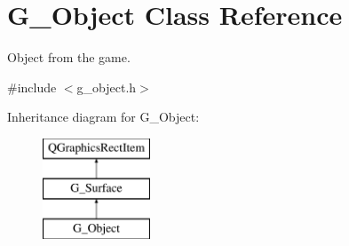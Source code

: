 \hypertarget{class_g___object}{}\section{G\+\_\+\+Object Class Reference}
\label{class_g___object}


Object from the game.  




{\ttfamily \#include $<$g\+\_\+object.\+h$>$}

Inheritance diagram for G\+\_\+\+Object\+:\begin{figure}[H]
\begin{center}
\leavevmode
\includegraphics[height=3.000000cm]{class_g___object}
\end{center}
\end{figure}
